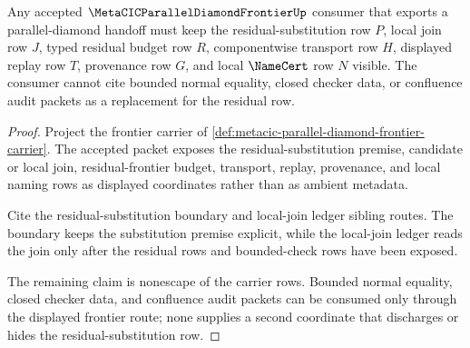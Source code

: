 \begin{theorem}
\label{thm:metacic-parallel-diamond-frontier-residual-row-visibility}
Any accepted $\MetaCICParallelDiamondFrontierUp$ consumer that exports a parallel-diamond handoff must keep the residual-substitution row $P$, local join row $J$, typed residual budget row $R$, componentwise transport row $H$, displayed replay row $T$, provenance row $G$, and local $\NameCert$ row $N$ visible. The consumer cannot cite bounded normal equality, closed checker data, or confluence audit packets as a replacement for the residual row.
\end{theorem}
\begin{proof}
Project the frontier carrier of \autoref{def:metacic-parallel-diamond-frontier-carrier}. The accepted packet exposes the residual-substitution premise, candidate or local join, residual-frontier budget, transport, replay, provenance, and local naming rows as displayed coordinates rather than as ambient metadata.

Cite the residual-substitution boundary and local-join ledger sibling routes. The boundary keeps the substitution premise explicit, while the local-join ledger reads the join only after the residual rows and bounded-check rows have been exposed.

The remaining claim is nonescape of the carrier rows. Bounded normal equality, closed checker data, and confluence audit packets can be consumed only through the displayed frontier route; none supplies a second coordinate that discharges or hides the residual-substitution row.
\end{proof}
